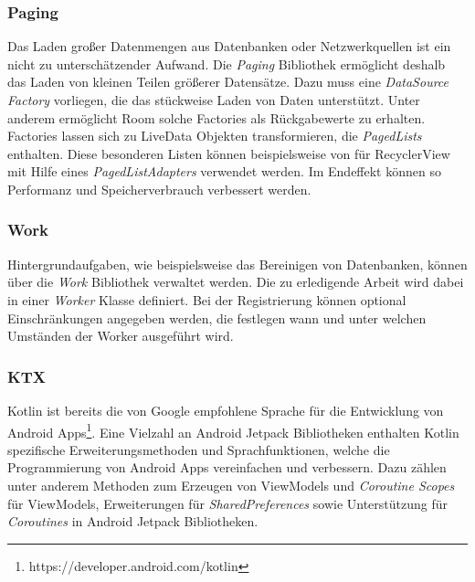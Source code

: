 \documentclass[a4paper, 11pt]{article}
\begin{document}
\subsubsection{Paging}
\label{subsubsec:app:jetpack:paging}
Das Laden großer Datenmengen aus Datenbanken oder Netzwerkquellen ist ein nicht zu unterschätzender Aufwand.
Die \textit{Paging} Bibliothek ermöglicht deshalb das Laden von kleinen Teilen größerer Datensätze.
Dazu muss eine \textit{DataSource Factory} vorliegen, die das stückweise Laden von Daten unterstützt.
Unter anderem ermöglicht Room solche Factories als Rückgabewerte zu erhalten.
Factories lassen sich zu LiveData Objekten transformieren, die \textit{PagedLists} enthalten.
Diese besonderen Listen können beispielsweise von für RecyclerView mit Hilfe eines \textit{PagedListAdapters} verwendet werden.
Im Endeffekt können so Performanz und Speicherverbrauch verbessert werden.

\subsubsection{Work}
\label{subsubsec:app:jetpack:work}
Hintergrundaufgaben, wie beispielsweise das Bereinigen von Datenbanken, können über die \textit{Work} Bibliothek verwaltet werden.
Die zu erledigende Arbeit wird dabei in einer \textit{Worker} Klasse definiert.
Bei der Registrierung können optional Einschränkungen angegeben werden, die festlegen wann und unter welchen Umständen der Worker ausgeführt wird.

\subsubsection{KTX}
\label{subsubsec:app:jetpack:extensions}
Kotlin ist bereits die von Google empfohlene Sprache für die Entwicklung von Android Apps\footnote{https://developer.android.com/kotlin}.
Eine Vielzahl an Android Jetpack Bibliotheken enthalten Kotlin spezifische Erweiterungsmethoden und Sprachfunktionen, welche die Programmierung von Android Apps vereinfachen und verbessern.
Dazu zählen unter anderem Methoden zum Erzeugen von ViewModels und \textit{Coroutine Scopes} für ViewModels, Erweiterungen für \textit{SharedPreferences} sowie Unterstützung für \textit{Coroutines} in Android Jetpack Bibliotheken.
\end{document}
